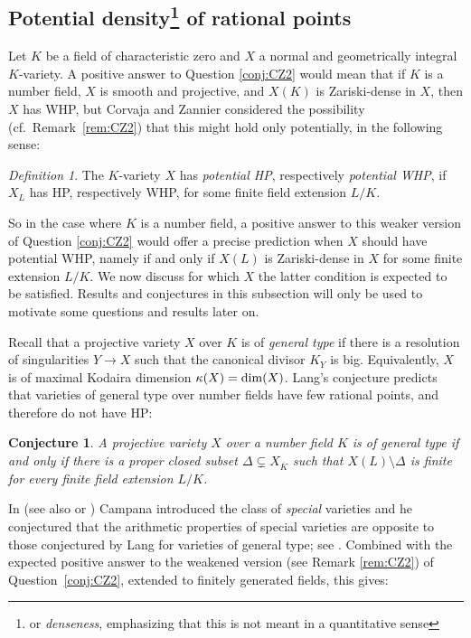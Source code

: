 \documentclass[10pt,a4paper]{amsart}
\theoremstyle{plain}
\newtheorem{conjecture}[theorem]{Conjecture}
\theoremstyle{remark}
\newtheorem{definition}[theorem]{Definition}
\numberwithin{theorem}{section}
\begin{document}
 

\subsection[Potential density of rational points]{Potential density\footnote{or {\em denseness}, emphasizing that this is not meant in a quantitative sense} of rational points}
\label{sec:denseness}
Let $K$ be a field of characteristic zero and $X$ a normal and geometrically integral $K$-variety.
A positive answer to Question \ref{conj:CZ2} would mean that
if $K$ is a number field, $X$ is smooth and projective, and $X(K)$ is Zariski-dense in $X$, then $X$ has WHP, but Corvaja and Zannier considered the possibility (cf.~Remark~\ref{rem:CZ2}) that this might hold only potentially, in the following sense: 

\begin{definition}
The $K$-variety $X$  has
{\em potential HP}, respectively {\em potential WHP},
if $X_L$ has HP, respectively WHP, for some finite field extension $L/K$. 
\end{definition}

So in the case where $K$ is a number field,
a positive answer to this weaker version of Question \ref{conj:CZ2} would offer a precise prediction when $X$ should have potential WHP,
namely if and only if $X(L)$ is Zariski-dense in $X$ for some finite extension $L/K$.
We now discuss for which $X$ the latter condition is expected to be satisfied.
Results and conjectures in this subsection will only be used to motivate some questions and results later on.

Recall that a projective variety $X$ over $K$ is of \emph{general type} if there is a resolution of singularities $Y\to X$ such that the  
canonical divisor $K_Y$ 
is big. 
Equivalently, $X$ is of maximal Kodaira dimension $\kappa(X)={\rm dim}(X)$. 
Lang's conjecture \cite[Conjecture~5.7]{Lang_conjectures} predicts that varieties of general type over number fields have few rational points,
and therefore do not have HP:
\begin{conjecture}\label{conjecture:lang_mordellic}
A projective variety $X$ over a number field $K$ is of general type
if and only if there is a proper closed subset $\Delta\subsetneq X_{\overline{K}}$ such that $X(L)\setminus \Delta$ is finite for every finite field extension $L/K$.
\end{conjecture}

 In \cite[Definition~2.1]{Ca04} (see also \cite[Definition~8.1]{Ca11} or \cite[Definition~1.2]{BJL}) Campana introduced the class of {\em special} varieties 
and he conjectured that the arithmetic properties of 
 special varieties are  opposite to those conjectured by Lang for varieties of general type; see \cite[Conjecture~13.23]{Ca11}.  Combined with the expected positive answer to the weakened version (see Remark \ref{rem:CZ2}) of 
Question~\ref{conj:CZ2},
extended to finitely generated fields,
this gives:
\end{document}
